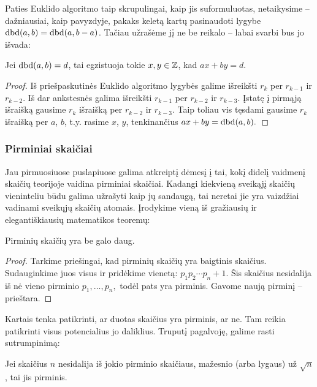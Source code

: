Paties Euklido algoritmo taip skrupulingai, kaip jis suformuluotas,
netaikysime -- dažniausiai, kaip pavyzdyje, pakaks keletą kartų pasinaudoti
lygybe $\operatorname{dbd}(a,b) = \operatorname{dbd}(a, b-a)$. Tačiau užrašėme jį ne be reikalo -- labai
svarbi bus jo išvada:

\begin{isv} 
  Jei $\operatorname{dbd}(a,b)=d$, tai egzistuoja tokie $x,y \in \mathbb Z$, kad $ax + by = d$.
\end{isv}

\begin{proof}
  Iš priešpaskutinės Euklido algoritmo lygybės galime išreikšti $r_{k}$ per
  $r_{k-1}$ ir $r_{k-2}$. Iš dar ankstesnės galima išreikšti $r_{k-1}$ per
  $r_{k-2}$ ir $r_{k−3}$. Įstatę į pirmąją išraišką gausime $r_{k}$ išraišką
  per $r_{k-2}$ ir $r_{k−3}$. Taip toliau vis tęsdami gausime $r_{k}$ išraišką
  per $a$, $b$, t.y. rasime $x$, $y$, tenkinančius $ax + by = \operatorname{dbd}(a,b).$
\end{proof}

\subsubsection{Pirminiai skaičiai}

Jau pirmuosiuose puslapiuose galima atkreiptį dėmesį į tai, kokį didelį vaidmenį
skaičių teorijoje vaidina pirminiai skaičiai. Kadangi kiekvieną sveikąjį
skaičių vieninteliu būdu galima užrašyti kaip jų sandaugą, tai neretai jie
yra vaizdžiai vadinami sveikųjų skaičių atomais. Įrodykime vieną iš
gražiausių ir elegantiškiausių matematikos teoremų:

\begin{thm} 
  Pirminių skaičių yra be galo daug.  
\end{thm} 

\begin{proof} 
  Tarkime priešingai, kad pirminių skaičių yra baigtinis skaičius.
  Sudauginkime juos visus ir pridėkime vienetą: $p_1p_2\cdots p_n + 1$. Šis
  skaičius nesidalija iš nė vieno pirminio $p_1, \dots, p_n,$ todėl pats
  yra pirminis. Gavome naują pirminį -- prieštara.
\end{proof}

Kartais tenka patikrinti, ar duotas skaičius yra pirminis, ar ne. Tam reikia
patikrinti visus potencialius jo daliklius. Truputį pagalvoję, galime rasti
sutrumpinimą: 

\begin{teig} 
  Jei skaičius $n$ nesidalija iš jokio pirminio skaičiaus, mažesnio (arba
  lygaus) už $\sqrt{n}$, tai jis pirminis.
\end{teig} 

